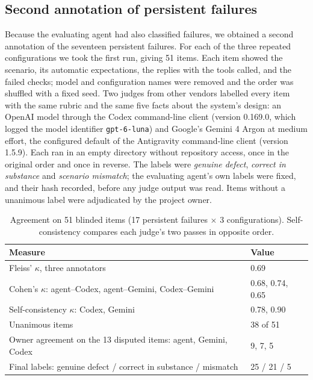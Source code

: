\documentclass[11pt,a4paper]{article}
\begin{document}
\subsection{Second annotation of persistent failures}\label{sec:annotation}
Because the evaluating agent had also classified failures, we obtained a second annotation of the seventeen persistent failures. For each of the three repeated configurations we took the first run, giving 51 items. Each item showed the scenario, its automatic expectations, the replies with the tools called, and the failed checks; model and configuration names were removed and the order was shuffled with a fixed seed. Two judges from other vendors labelled every item with the same rubric and the same five facts about the system's design: an OpenAI model through the Codex command-line client (version 0.169.0, which logged the model identifier \texttt{gpt-6-luna}) and Google's Gemini 4 Argon at medium effort, the configured default of the Antigravity command-line client (version 1.5.9). Each ran in an empty directory without repository access, once in the original order and once in reverse. The labels were \emph{genuine defect}, \emph{correct in substance} and \emph{scenario mismatch}; the evaluating agent's own labels were fixed, and their hash recorded, before any judge output was read. Items without a unanimous label were adjudicated by the project owner.

\begin{table}[tbp]
\caption{Agreement on 51 blinded items (17 persistent failures $\times$ 3 configurations). Self-consistency compares each judge's two passes in opposite order.}\label{tab:annotation}
\centering\small
\begin{tabularx}{\linewidth}{P{.46\linewidth}Y}\toprule
Measure & Value\\\midrule
Fleiss' $\kappa$, three annotators & 0.69\\
Cohen's $\kappa$: agent--Codex, agent--Gemini, Codex--Gemini & 0.68, 0.74, 0.65\\
Self-consistency $\kappa$: Codex, Gemini & 0.78, 0.90\\
Unanimous items & 38 of 51\\
Owner agreement on the 13 disputed items: agent, Gemini, Codex & 9, 7, 5\\
Final labels: genuine defect / correct in substance / mismatch & 25 / 21 / 5\\\bottomrule
\end{tabularx}
\end{table}
\end{document}
